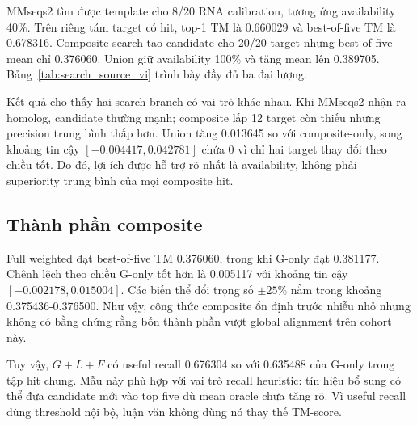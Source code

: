 \documentclass[12pt,a4paper,oneside]{report}
\begin{document}
MMseqs2 tìm được template cho 8/20 RNA calibration, tương ứng availability 40\%. Trên
riêng tám target có hit, top-1 TM là 0.660029 và best-of-five TM là 0.678316. Composite
search tạo candidate cho 20/20 target nhưng best-of-five mean chỉ 0.376060. Union giữ
availability 100\% và tăng mean lên 0.389705. Bảng~\ref{tab:search_source_vi} trình bày
đầy đủ ba đại lượng.

\begin{table}[H]
\centering
\caption{Ảnh hưởng của nguồn truy hồi trên 20 RNA calibration. Điểm MMseqs2 là conditional
trên tám target có hit.}
\label{tab:search_source_vi}
\end{table}

Kết quả cho thấy hai search branch có vai trò khác nhau. Khi MMseqs2 nhận ra homolog,
candidate thường mạnh; composite lấp 12 target còn thiếu nhưng precision trung bình thấp
hơn. Union tăng 0.013645 so với composite-only, song khoảng tin cậy
$[-0.004417,0.042781]$ chứa 0 vì chỉ hai target thay đổi theo chiều tốt. Do đó, lợi ích
được hỗ trợ rõ nhất là availability, không phải superiority trung bình của mọi composite
hit.

\subsection{Thành phần composite}

Full weighted đạt best-of-five TM 0.376060, trong khi G-only đạt 0.381177. Chênh lệch
theo chiều G-only tốt hơn là 0.005117 với khoảng tin cậy
$[-0.002178,0.015004]$. Các biến thể đổi trọng số $\pm25\%$ nằm trong khoảng
0.375436-0.376500. Như vậy, công thức composite ổn định trước nhiễu nhỏ nhưng không có
bằng chứng rằng bốn thành phần vượt global alignment trên cohort này.

Tuy vậy, $G+L+F$ có useful recall 0.676304 so với 0.635488 của G-only trong tập hit chung.
Mẫu này phù hợp với vai trò recall heuristic: tín hiệu bổ sung có thể đưa candidate mới
vào top five dù mean oracle chưa tăng rõ. Vì useful recall dùng threshold nội bộ, luận
văn không dùng nó thay thế TM-score.
\end{document}
